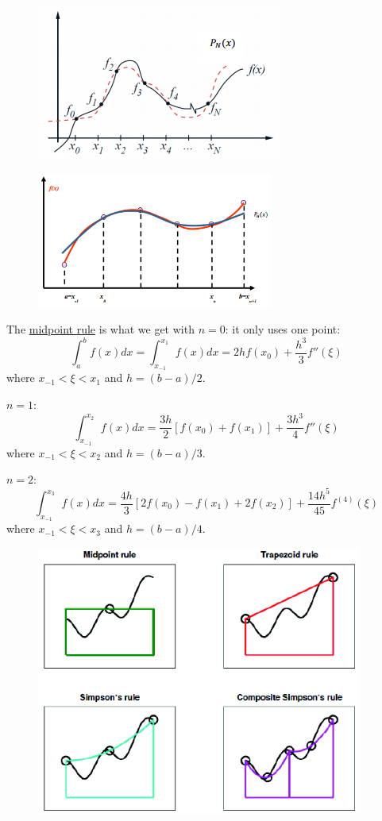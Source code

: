 \documentclass[12pt]{article}
\begin{document}
\begin{figure}
\begin{center}
  \includegraphics[height=2in,clip]{ClosedNewtonCotes}
\end{center}
\end{figure}
\begin{figure}
\begin{center}
  \includegraphics[height=1.75in,clip]{OpenNewtonCotes}
\end{center}
\end{figure}


The \underline{midpoint rule} is what we get with \underline{$n=0$}: it only uses one point:
\[\int_a^b f(x)dx = \int_{x_{-1}}^{x_{1}} f(x)dx = 2hf(x_0) + \frac{h^3}{3}f''(\xi)\]
where $x_{-1} < \xi < x_{1}$ and $h=(b-a)/2$.

\underline{$n=1$}:
\[ \int_{x_{-1}}^{x_{2}} f(x)dx = \frac{3h}{2}[f(x_0) + f(x_1)] + \frac{3h^3}{4}f''(\xi)\]
where $x_{-1} < \xi < x_{2}$ and $h=(b-a)/3$.

\underline{$n=2$}:
\[ \int_{x_{-1}}^{x_{3}} f(x)dx = \frac{4h}{3}[2f(x_0) - f(x_1) + 2f(x_2)] + \frac{14h^5}{45}f^{(4)}(\xi)\]
where $x_{-1} < \xi < x_{3}$ and $h=(b-a)/4$.

\begin{figure}
\begin{center}
  \includegraphics[height=3.5in,clip]{QuadratureComparison}
\end{center}
\end{figure}

%
% 
\end{document}
